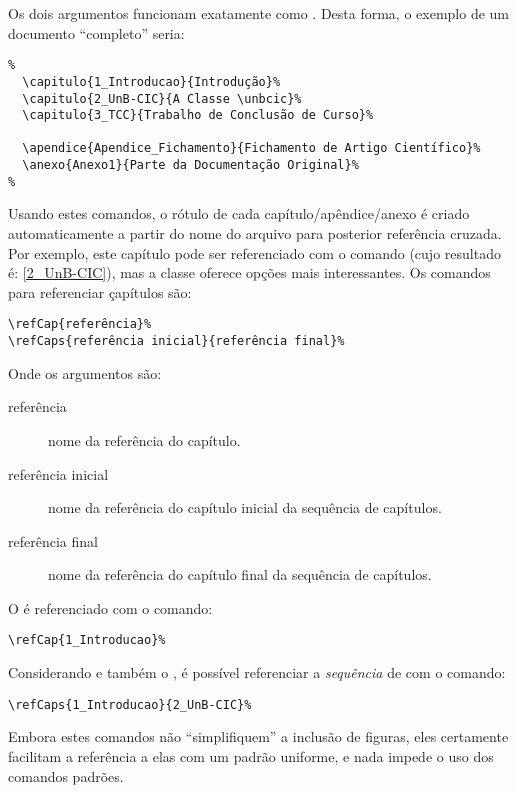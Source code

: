 Os dois argumentos funcionam exatamente como . Desta forma,
o exemplo de um documento ``completo'' seria: %

\begin{verbatim}
%
  \capitulo{1_Introducao}{Introdução}%
  \capitulo{2_UnB-CIC}{A Classe \unbcic}%
  \capitulo{3_TCC}{Trabalho de Conclusão de Curso}%

  \apendice{Apendice_Fichamento}{Fichamento de Artigo Científico}%
  \anexo{Anexo1}{Parte da Documentação Original}%
%
\end{verbatim}

Usando estes comandos, o rótulo de cada capítulo/apêndice/anexo é criado
automaticamente a partir do nome do arquivo para posterior referência cruzada.
Por exemplo, este capítulo pode ser referenciado com o comando
 (cujo resultado é: \ref{2_UnB-CIC}), mas a classe
oferece opções mais interessantes. Os comandos para referenciar çapítulos são:

\begin{verbatim}
\refCap{referência}%
\refCaps{referência inicial}{referência final}%
\end{verbatim}

Onde os argumentos são:
\begin{description}
\item[referência] nome da referência do capítulo.
\item[referência inicial] nome da referência do capítulo inicial da sequência de capítulos.
\item[referência final] nome da referência do capítulo final da sequência de capítulos.
\end{description}

O  é referenciado com o comando:
\begin{verbatim}
\refCap{1_Introducao}%
\end{verbatim}

Considerando   e também o , é possível referenciar
a \emph{sequência} de  com o comando:
\begin{verbatim}
\refCaps{1_Introducao}{2_UnB-CIC}%
\end{verbatim}

Embora estes comandos não ``simplifiquem'' a inclusão de figuras, eles
certamente facilitam a referência a elas com um padrão uniforme, e nada impede o
uso dos comandos padrões.

